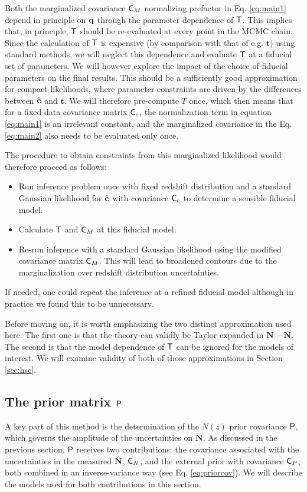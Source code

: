 \documentclass[a4paper,11pt]{article}
\newcommand{\vt}{\mathbf{t}}
\newcommand{\vN}{\mathbf{N}}
\begin{document}
      Both the marginalized covariance ${\sf C}_M$ normalizing prefactor in Eq. \ref{eq:main1} depend in principle on ${\bf q}$ through the parameter dependence of ${\sf T}$. This implies that, in principle, ${\sf T}$ should be re-evaluated at every point in the MCMC chain. Since the calculation of ${\sf T}$ is expensive (by comparison with that of e.g. $\vt$) using standard methods, we will neglect this dependence and evaluate ${\sf T}$ at a fiducial set of parameters. We will however explore the impact of the choice of fiducial parameters on the final results. This should be a sufficiently good approximation for compact likelihoods, where parameter constraints are driven by the differences between $\hat{\bf c}$ and $\vt$. We will therefore pre-compute $T$ once, which then means that for a fixed data covariance matrix ${\sf C}_c$, the normalization term in equation \ref{eq:main1} is an irrelevant constant, and the marginalized covariance in the Eq. \ref{eq:main2} also needs to be evaluated only once.

      The procedure to obtain constraints from this marginalized likelihood would therefore proceed as follows:
      \begin{itemize}
        \item Run inference problem once with fixed redshift distribution and a standard Gaussian likelihood for $\hat{\bf c}$ with covariance ${\sf C}_c$ to determine a sensible fiducial model.
        \item Calculate ${\sf T}$ and ${\sf C}_M$ at this fiducial model.
        \item Re-run inference with a standard Gaussian likelihood using the modified covariance matrix ${\sf C}_M$. This will lead to broadened contours due to the marginalization over redshift distribution uncertainties.
      \end{itemize}
      If needed, one could repeat the inference at a refined fiducial model although in practice we found this to be unnecessary.

      Before moving on, it is worth emphasizing the two distinct approximation used here. The first one is that the theory can validly be Taylor expanded in $\vN-\bar{\vN}$. The second is that the model dependence of ${\sf T}$ can be ignored for the models of interest. We will examine validity of both of those approximations in Section \ref{sec:hsc}.
      
    \subsection{The prior matrix ${\sf P}$}\label{ssec:theory.prior}
      A key part of this method is the determination of the $N(z)$ prior covariance ${\sf P}$, which governs the amplitude of the uncertainties on $\vN$. As discussed in the previous section, ${\sf P}$ receives two contributions: the covariance associated with the uncertainties in the measured $\hat{\bf N}$, ${\sf C}_N$, and the external prior with covariance ${\sf C}_P$, both combined in an inverse-variance way (see Eq. \ref{eq:priorcov}). We will describe the models used for both contributions in this section.
\end{document}
